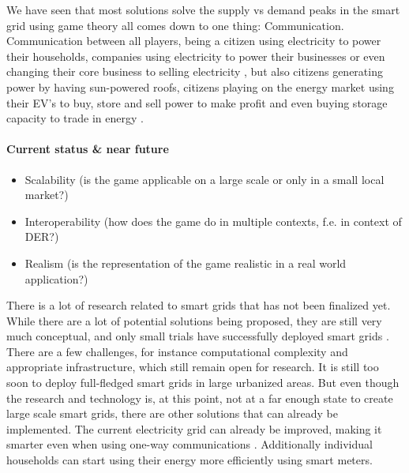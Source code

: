 We have seen that most solutions solve the supply vs demand peaks in the smart grid using game theory all comes down to one thing: Communication. Communication between all players, being a citizen using electricity to power their households, companies using electricity to power their businesses or even changing their core business to selling electricity \cite{Binczewski2002,Kumagai2012}, but also citizens generating power by having sun-powered roofs, citizens playing on the energy market using their EV's to buy, store and sell power to make profit and even buying storage capacity to trade in energy .

\paragraph{Current status \& near future}


\begin{itemize}
	\item Scalability (is the game applicable on a large scale or only in a small local market?)
	\item Interoperability (how does the game do in multiple contexts, f.e. in context of DER?)
	\item Realism (is the representation of the game realistic in a real world application?)
\end{itemize}

There is a lot of research related to smart grids that has not been finalized yet. While there are a lot of potential solutions being proposed, they are still very much conceptual, and only small trials have successfully deployed smart grids \cite{Kumagai2012,HatziargyriouAsanoIravaniMarnay2007}. There are a few challenges, for instance computational complexity and appropriate infrastructure, which still remain open for research. It is still too soon to deploy full-fledged smart grids in large urbanized areas.
But even though the research and technology is, at this point, not at a far enough state to create large scale smart grids, there are other solutions that can already be implemented. The current electricity grid can already be improved, making it smarter even when using one-way communications \cite{Alamaniotis2010}. Additionally individual households can start using their energy more efficiently using smart meters. 


